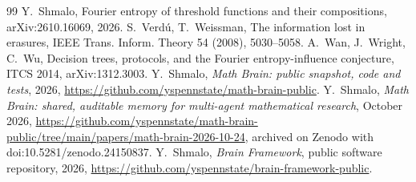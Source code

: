 \documentclass[11pt]{amsart}
\theoremstyle{remark}
\begin{document}
\begin{thebibliography}{99}
 Y.~Shmalo, Fourier entropy of threshold functions and their compositions,
arXiv:2610.16069, 2026.
 S.~Verd\'u, T.~Weissman, The information lost in erasures, IEEE Trans. Inform. Theory 54 (2008),
5030--5058.
 A.~Wan, J.~Wright, C.~Wu, Decision trees, protocols, and the Fourier entropy-influence conjecture, ITCS 2014,
arXiv:1312.3003.
 Y.~Shmalo, \emph{Math Brain: public snapshot, code and tests}, 2026,
\url{https://github.com/yspennstate/math-brain-public}.
 Y.~Shmalo, \emph{Math Brain: shared, auditable memory for multi-agent mathematical research},
October 2026, \url{https://github.com/yspennstate/math-brain-public/tree/main/papers/math-brain-2026-10-24}, archived on Zenodo with doi:10.5281/zenodo.24150837.
 Y.~Shmalo, \emph{Brain Framework}, public software repository, 2026,
\url{https://github.com/yspennstate/brain-framework-public}.
\end{thebibliography}
\end{document}
